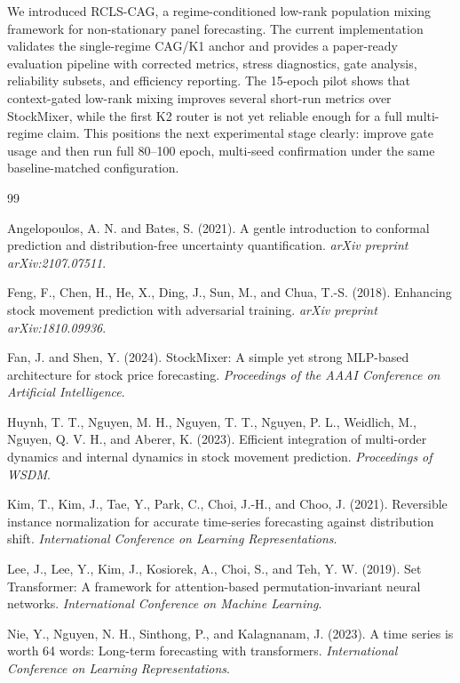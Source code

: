 \documentclass{article}
\begin{document}
We introduced RCLS-CAG, a regime-conditioned low-rank population mixing framework for non-stationary panel forecasting. The current implementation validates the single-regime CAG/K1 anchor and provides a paper-ready evaluation pipeline with corrected metrics, stress diagnostics, gate analysis, reliability subsets, and efficiency reporting. The 15-epoch pilot shows that context-gated low-rank mixing improves several short-run metrics over StockMixer, while the first K2 router is not yet reliable enough for a full multi-regime claim. This positions the next experimental stage clearly: improve gate usage and then run full 80--100 epoch, multi-seed confirmation under the same baseline-matched configuration.

\begin{thebibliography}{99}

Angelopoulos, A. N. and Bates, S. (2021).
A gentle introduction to conformal prediction and distribution-free uncertainty quantification.
\emph{arXiv preprint arXiv:2107.07511}.

Feng, F., Chen, H., He, X., Ding, J., Sun, M., and Chua, T.-S. (2018).
Enhancing stock movement prediction with adversarial training.
\emph{arXiv preprint arXiv:1810.09936}.

Fan, J. and Shen, Y. (2024).
StockMixer: A simple yet strong MLP-based architecture for stock price forecasting.
\emph{Proceedings of the AAAI Conference on Artificial Intelligence}.

Huynh, T. T., Nguyen, M. H., Nguyen, T. T., Nguyen, P. L., Weidlich, M., Nguyen, Q. V. H., and Aberer, K. (2023).
Efficient integration of multi-order dynamics and internal dynamics in stock movement prediction.
\emph{Proceedings of WSDM}.

Kim, T., Kim, J., Tae, Y., Park, C., Choi, J.-H., and Choo, J. (2021).
Reversible instance normalization for accurate time-series forecasting against distribution shift.
\emph{International Conference on Learning Representations}.

Lee, J., Lee, Y., Kim, J., Kosiorek, A., Choi, S., and Teh, Y. W. (2019).
Set Transformer: A framework for attention-based permutation-invariant neural networks.
\emph{International Conference on Machine Learning}.

Nie, Y., Nguyen, N. H., Sinthong, P., and Kalagnanam, J. (2023).
A time series is worth 64 words: Long-term forecasting with transformers.
\emph{International Conference on Learning Representations}.


\end{thebibliography}
\end{document}
